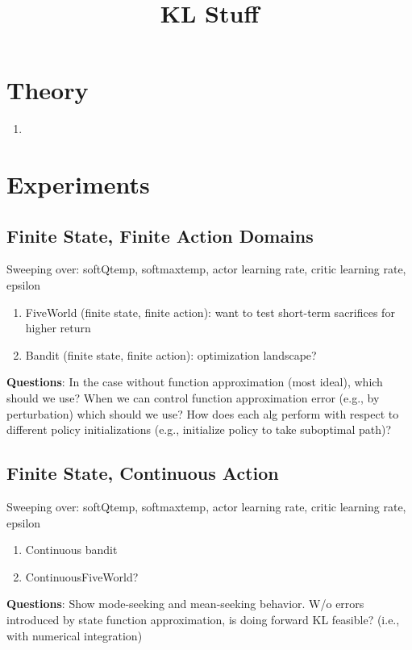 \documentclass{article}
\title{KL Stuff}
\date{}
\begin{document}
\maketitle
\section{Theory}
\begin{enumerate}
    \item 
\end{enumerate}

\section{Experiments}


\subsection{Finite State, Finite Action Domains}
Sweeping over: softQtemp, softmaxtemp, actor learning rate, critic learning rate, epsilon
\begin{enumerate}
    \item FiveWorld (finite state, finite action): want to test short-term sacrifices for higher return
    \item Bandit (finite state, finite action): optimization landscape?
\end{enumerate}

\textbf{Questions}: In the case without function approximation (most ideal), which should we use? When we can control function approximation error (e.g., by perturbation) which should we use? How does each alg perform with respect to different policy initializations (e.g., initialize policy to take suboptimal path)?

\subsection{Finite State, Continuous Action}
Sweeping over: softQtemp, softmaxtemp, actor learning rate, critic learning rate, epsilon
\begin{enumerate}
    \item Continuous bandit
    \item ContinuousFiveWorld?
\end{enumerate}
\textbf{Questions}: 
Show mode-seeking and mean-seeking behavior.
W/o errors introduced by state function approximation, is doing forward KL feasible? (i.e., with numerical integration)
\end{document}
